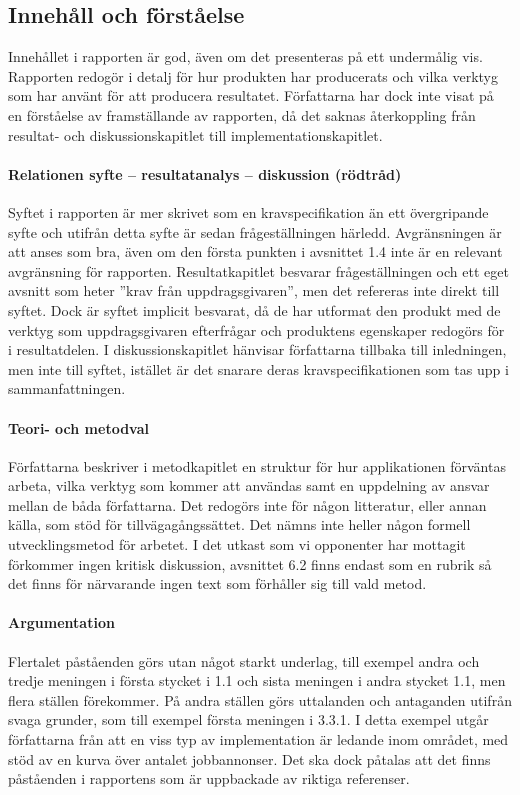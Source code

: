     \subsection{Innehåll och förståelse} %
    \label{sub:innehall}
    Innehållet i rapporten är god, även om det presenteras på ett undermålig vis. Rapport\-en redogör i detalj för hur produkten har producerats och vilka verktyg som har använt för att producera resultatet. Författarna har dock inte visat på en förståelse av framställande av rapporten, då det saknas återkoppling från resultat- och diskussionskapitlet till implementationskapitlet.

    \paragraph{Relationen syfte – resultatanalys – diskussion (rödtråd)}
        Syftet i rapporten är mer skrivet som en kravspecifikation än ett övergripande syfte och utifrån detta syfte är sedan frågeställningen härledd. Avgränsningen är att anses som bra, även om den första punkten i avsnittet 1.4 inte är en relevant avgränsning för rapporten. Resultatkapitlet besvarar frågeställningen och ett eget avsnitt som heter ''krav från uppdragsgivaren'', men det refereras inte direkt till syftet. Dock är syftet implicit besvarat, då de har utformat den produkt med de verktyg som uppdragsgivaren efterfrågar och produktens egenskaper redogörs för i resultatdelen. I diskussionskapitlet hänvisar författarna tillbaka till inledningen, men inte till syftet, istället är det snarare deras kravspecifikationen som tas upp i sammanfattningen.

    \paragraph{Teori- och metodval}
        Författarna beskriver i metodkapitlet en struktur för hur applikationen förväntas arbeta, vilka verktyg som kommer att användas samt en uppdelning av ansvar mellan de båda författarna. Det redogörs inte för någon litteratur, eller annan källa, som stöd för tillvägagångssättet. Det nämns inte heller någon formell utvecklingsmetod för arbetet. I det utkast som vi opponenter har mottagit förkommer ingen kritisk diskussion, avsnittet 6.2 finns endast som en rubrik så det finns för närvarande ingen text som förhåller sig till vald metod.

    \paragraph{Argumentation}
        Flertalet påståenden görs utan något starkt underlag, till exempel andra och tredje meningen i första stycket i 1.1 och sista meningen i andra stycket 1.1, men flera ställen förekommer. På andra ställen görs uttalanden och antaganden utifrån svaga grunder, som till exempel första meningen i 3.3.1. I detta exempel utgår författarna från att en viss typ av implementation är ledande inom området, med stöd av en kurva över antalet jobbannonser. Det ska dock påtalas att det finns påståenden i rapportens som är uppbackade av riktiga referenser.


